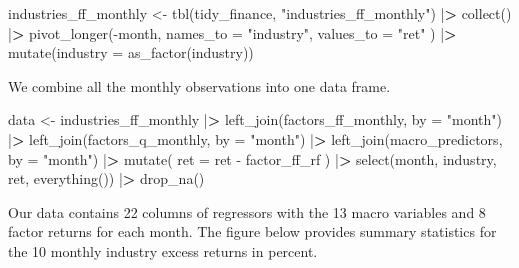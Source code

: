 \documentclass[
]{krantz}
\newenvironment{Shaded}{\begin{snugshade}}{\end{snugshade}}
\newcommand{\AttributeTok}[1]{\textcolor[rgb]{0.61,0.61,0.61}{#1}}
\newcommand{\ErrorTok}[1]{\textcolor[rgb]{0.14,0.14,0.14}{\textbf{#1}}}
\newcommand{\FunctionTok}[1]{\textcolor[rgb]{0,0,0}{#1}}
\newcommand{\NormalTok}[1]{#1}
\newcommand{\OtherTok}[1]{\textcolor[rgb]{0.37,0.37,0.37}{#1}}
\newcommand{\SpecialCharTok}[1]{\textcolor[rgb]{0,0,0}{#1}}
\newcommand{\StringTok}[1]{\textcolor[rgb]{0.5,0.5,0.5}{#1}}
\begin{document}
\begin{Shaded}
\begin{Highlighting}[]
\NormalTok{industries\_ff\_monthly }\OtherTok{\textless{}{-}} \FunctionTok{tbl}\NormalTok{(tidy\_finance, }\StringTok{"industries\_ff\_monthly"}\NormalTok{) }\SpecialCharTok{|}\ErrorTok{\textgreater{}}
  \FunctionTok{collect}\NormalTok{() }\SpecialCharTok{|}\ErrorTok{\textgreater{}}
  \FunctionTok{pivot\_longer}\NormalTok{(}\SpecialCharTok{{-}}\NormalTok{month,}
    \AttributeTok{names\_to =} \StringTok{"industry"}\NormalTok{, }\AttributeTok{values\_to =} \StringTok{"ret"}
\NormalTok{  ) }\SpecialCharTok{|}\ErrorTok{\textgreater{}}
  \FunctionTok{mutate}\NormalTok{(}\AttributeTok{industry =} \FunctionTok{as\_factor}\NormalTok{(industry))}
\end{Highlighting}
\end{Shaded}

We combine all the monthly observations into one data frame.

\begin{Shaded}
\begin{Highlighting}[]
\NormalTok{data }\OtherTok{\textless{}{-}}\NormalTok{ industries\_ff\_monthly }\SpecialCharTok{|}\ErrorTok{\textgreater{}}
  \FunctionTok{left\_join}\NormalTok{(factors\_ff\_monthly, }\AttributeTok{by =} \StringTok{"month"}\NormalTok{) }\SpecialCharTok{|}\ErrorTok{\textgreater{}}
  \FunctionTok{left\_join}\NormalTok{(factors\_q\_monthly, }\AttributeTok{by =} \StringTok{"month"}\NormalTok{) }\SpecialCharTok{|}\ErrorTok{\textgreater{}}
  \FunctionTok{left\_join}\NormalTok{(macro\_predictors, }\AttributeTok{by =} \StringTok{"month"}\NormalTok{) }\SpecialCharTok{|}\ErrorTok{\textgreater{}}
  \FunctionTok{mutate}\NormalTok{(}
    \AttributeTok{ret =}\NormalTok{ ret }\SpecialCharTok{{-}}\NormalTok{ factor\_ff\_rf}
\NormalTok{  ) }\SpecialCharTok{|}\ErrorTok{\textgreater{}}
  \FunctionTok{select}\NormalTok{(month, industry, ret, }\FunctionTok{everything}\NormalTok{()) }\SpecialCharTok{|}\ErrorTok{\textgreater{}}
  \FunctionTok{drop\_na}\NormalTok{()}
\end{Highlighting}
\end{Shaded}

Our data contains 22 columns of regressors with the 13 macro variables and 8 factor returns for each month.
The figure below provides summary statistics for the 10 monthly industry excess returns in percent.
\end{document}
